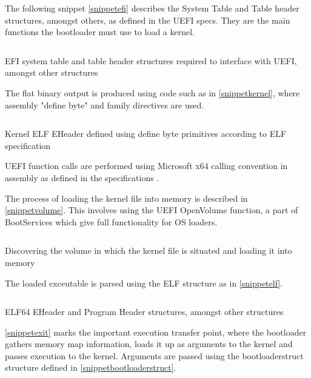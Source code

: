 \documentclass[conference]{IEEEtran}
\begin{document}
The following snippet \ref{snippetefi} describes the System Table and Table header structures, amongst others, as defined in the UEFI specs. They are the main functions the bootloader must use to load a kernel.

\begin{listing}[!t]
    \inputminted[breaklines,breakanywhere,frame=single]{nasm}{snippetefi.asm}
    \caption{EFI system table and table header structures required to interface with UEFI, amongst other structures}
    \label{snippetefi}
\end{listing}

The flat binary output is produced using code such as in \ref{snippetkernel}, where assembly "define byte" and family directives are used.

\begin{listing}[!t]
    \inputminted[breaklines,breakanywhere,frame=single]{nasm}{snippetkernel.asm}
    \caption{Kernel ELF EHeader defined using define byte primitives according to ELF specification}
    \label{snippetkernel}
\end{listing}

UEFI function calls are performed using Microsoft x64 calling convention in assembly as defined in the specifications \cite{microsoftx64calling}.

The process of loading the kernel file into memory is described in \ref{snippetvolume}. This involves using the UEFI OpenVolume function, a part of BootServices which give full functionality for OS loaders.

\begin{listing}[!t]
    \inputminted[breaklines,breakanywhere,frame=single]{nasm}{snippetvolume.asm}
    \caption{Discovering the volume in which the kernel file is situated and loading it into memory}
    \label{snippetvolume}
\end{listing}

The loaded exceutable is parsed using the ELF structure as in \ref{snippetelf}.

\begin{listing}[!t]
    \inputminted[breaklines,breakanywhere,frame=single]{nasm}{snippetelf.asm}
    \caption{ELF64 EHeader and Program Header structures, amongst other structures}
    \label{snippetelf}
\end{listing}

\ref{snippetexit} marks the important execution transfer point, where the bootloader gathers memory map information, loads it up as arguments to the kernel and passes execution to the kernel. Arguments are passed using the bootloaderstruct structure defined in \ref{snippetbootloaderstruct}.
\end{document}

